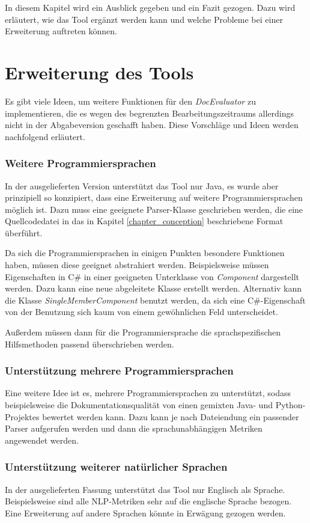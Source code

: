 In diesem Kapitel wird ein Ausblick gegeben und ein Fazit gezogen. Dazu wird erläutert, wie das Tool ergänzt werden kann und welche Probleme bei einer Erweiterung auftreten können.
\section{Erweiterung des Tools}
Es gibt viele Ideen, um weitere Funktionen für den \textit{DocEvaluator} zu implementieren, die es wegen des begrenzten Bearbeitungszeitraums allerdings nicht in der Abgabeversion geschafft haben. Diese Vorschläge und Ideen werden nachfolgend erläutert.
\subsubsection{Weitere Programmiersprachen}
In der ausgelieferten Version unterstützt das Tool nur Java, es wurde aber prinzipiell so konzipiert, dass eine Erweiterung auf weitere Programmiersprachen möglich ist. Dazu muss eine geeignete Parser-Klasse geschrieben werden, die eine Quellcodedatei in das in Kapitel \ref{chapter_conception} beschriebene Format überführt. 

Da sich die Programmiersprachen in einigen Punkten besondere Funktionen haben, müssen diese geeignet abstrahiert werden. Beispielsweise müssen Eigenschaften in C\# in einer geeigneten Unterklasse von \textit{Component} dargestellt werden. Dazu kann eine neue abgeleitete Klasse erstellt werden. Alternativ kann die Klasse \textit{SingleMemberComponent}  benutzt werden, da sich eine C\#-Eigenschaft von der Benutzung sich kaum von einem gewöhnlichen Feld unterscheidet.

Außerdem müssen dann für die Programmiersprache die sprachspezifischen Hilfsmethoden passend überschrieben werden.

\subsubsection{Unterstützung mehrere Programmiersprachen}
Eine weitere Idee ist es, mehrere Programmiersprachen zu unterstützt, sodass  beispielsweise die Dokumentationsqualität von einen gemixten Java- und Python-Projektes bewertet werden kann. Dazu kann je nach Dateiendung ein passender Parser aufgerufen werden und dann die sprachunabhängigen Metriken angewendet werden.

\subsubsection{Unterstützung weiterer natürlicher Sprachen}
In der ausgelieferten Fassung unterstützt das Tool nur Englisch als Sprache. Beispielsweise sind alle \ac{NLP}-Metriken sehr auf die englische Sprache bezogen. Eine Erweiterung auf andere Sprachen könnte in Erwägung gezogen werden. 

